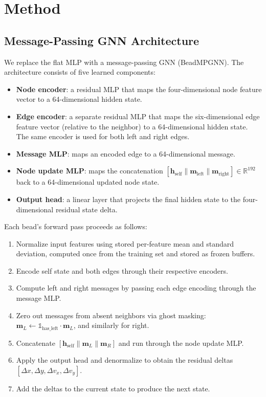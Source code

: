 \documentclass[conference]{IEEEtran}
\begin{document}
\section{Method}

\subsection{Message-Passing GNN Architecture}

We replace the flat MLP with a message-passing GNN (BeadMPGNN). The architecture consists of five learned components:

\begin{itemize}
    \item \textbf{Node encoder}: a residual MLP that maps the four-dimensional node feature vector to a 64-dimensional hidden state.
    \item \textbf{Edge encoder}: a separate residual MLP that maps the six-dimensional edge feature vector (relative to the neighbor) to a 64-dimensional hidden state. The same encoder is used for both left and right edges.
    \item \textbf{Message MLP}: maps an encoded edge to a 64-dimensional message.
    \item \textbf{Node update MLP}: maps the concatenation $[\mathbf{h}_{\text{self}} \| \mathbf{m}_{\text{left}} \| \mathbf{m}_{\text{right}}] \in \mathbb{R}^{192}$ back to a 64-dimensional updated node state.
    \item \textbf{Output head}: a linear layer that projects the final hidden state to the four-dimensional residual state delta.
\end{itemize}

Each bead's forward pass proceeds as follows:
\begin{enumerate}
    \item Normalize input features using stored per-feature mean and standard deviation, computed once from the training set and stored as frozen buffers.
    \item Encode self state and both edges through their respective encoders.
    \item Compute left and right messages by passing each edge encoding through the message MLP.
    \item Zero out messages from absent neighbors via ghost masking: $\mathbf{m}_L \leftarrow \mathbb{1}_{\text{has\_left}} \cdot \mathbf{m}_L$, and similarly for right.
    \item Concatenate $[\mathbf{h}_{\text{self}} \| \mathbf{m}_L \| \mathbf{m}_R]$ and run through the node update MLP.
    \item Apply the output head and denormalize to obtain the residual deltas $[\Delta x, \Delta y, \Delta v_x, \Delta v_y]$.
    \item Add the deltas to the current state to produce the next state.
\end{enumerate}
\end{document}
